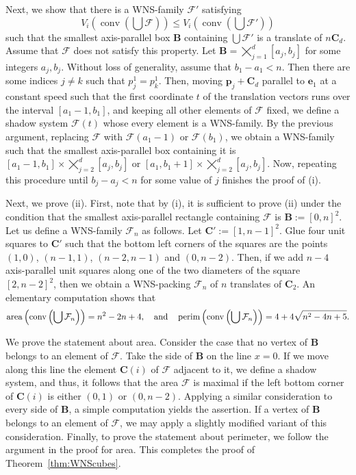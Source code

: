 \documentclass[12pt]{article}
\DeclareMathOperator{\conv}{conv}
\DeclareMathOperator{\area}{area}
\DeclareMathOperator{\perim}{perim}
\newcommand{\C}{\mathbf{C}}
\newcommand{\e}{\mathbf{e}}
\newcommand{\p}{\mathbf{p}}
\begin{document}
Next, we show that there is a WNS-family $\mathcal{F}'$ satisfying $$V_i\left( \conv \left( \bigcup \mathcal{F}\right) \right) \leq V_i\left( \conv {\left( \bigcup \mathcal{F}'\right)} \right)$$ such that the smallest axis-parallel box $\mathbf{B}$ containing $\bigcup \mathcal{F}'$ is a translate of $n \C_d$. Assume that $\mathcal{F}$ does not satisfy this property. Let $\mathbf{B} = \bigtimes_{j=1}^d [a_j,b_j]$ for some integers $a_j,b_j$. Without loss of generality, assume that $b_1 - a_1 < n$. Then there are some indices $j \neq k$ such that $p_j^1 = p_k^1$. Then, moving $\p_j + \C_d$ parallel to $\e_1$ at a constant speed such that the first coordinate $t$ of the translation vectors runs over the interval $[a_1-1,b_1]$, and keeping all other elements of $\mathcal{F}$ fixed, we define a shadow system $\mathcal{F}(t)$ whose every element is a WNS-family. By the previous argument, replacing $\mathcal{F}$ with $\mathcal{F}(a_1-1)$ or $\mathcal{F}(b_1)$, we obtain a WNS-family such that the smallest axis-parallel box containing it is $[a_1-1,b_1] \times \bigtimes_{j=2}^d [a_j,b_j]$ or $[a_1,b_1+1] \times \bigtimes_{j=2}^d [a_j,b_j]$.
Now, repeating this procedure until $b_j-a_j < n$ for some value of $j$ finishes the proof of (i).

Next, we prove (ii). First, note that by (i), it is sufficient to prove (ii) under the condition that the smallest axis-parallel rectangle containing $\mathcal{F}$ is $\mathbf{B}:=[0,n]^2$. Let us define a WNS-family $\mathcal{F}_n$ as follows. Let $\C' :=[1,n-1]^2$. Glue four unit squares to $\C'$ such that the bottom left corners of the squares are the points $(1,0)$, $(n-1,1)$, $(n-2,n-1)$ and $(0,n-2)$. Then, if we add $n-4$ axis-parallel unit squares along one of the two diameters of the square $[2,n-2]^2$, then we obtain a WNS-packing $\mathcal{F}_n$ of $n$ translates of $\C_2$. An elementary computation shows that
\[
\area\left( \conv \left( \bigcup \mathcal{F}_n\right) \right)  = n^2 - 2n+4, \quad \hbox{and} \quad \perim\left( \conv \left( \bigcup \mathcal{F}_n \right) \right)  = 4+ 4\sqrt{n^2 - 4n+5}.
\]

We prove the statement about area. Consider the case that no vertex of $\mathbf{B}$ belongs to an element of $\mathcal{F}$. Take the side of $\mathbf{B}$ on the line $x=0$. If we move along this line the element $\C(i)$ of $\mathcal{F}$ adjacent to it, we define a shadow system, and thus, it follows that the area $\mathcal{F}$ is maximal if the left bottom corner of $\C(i)$ is either $(0,1)$ or $(0,n-2)$. Applying a similar consideration to every side of $\mathbf{B}$, a simple computation yields the assertion. If a vertex of $\mathbf{B}$ belongs to an element of $\mathcal{F}$, we may apply a slightly modified variant of this consideration.
Finally, to prove the statement about perimeter, we follow the argument in the proof for area. This completes the proof of Theorem~\ref{thm:WNScubes}.
\end{document}
